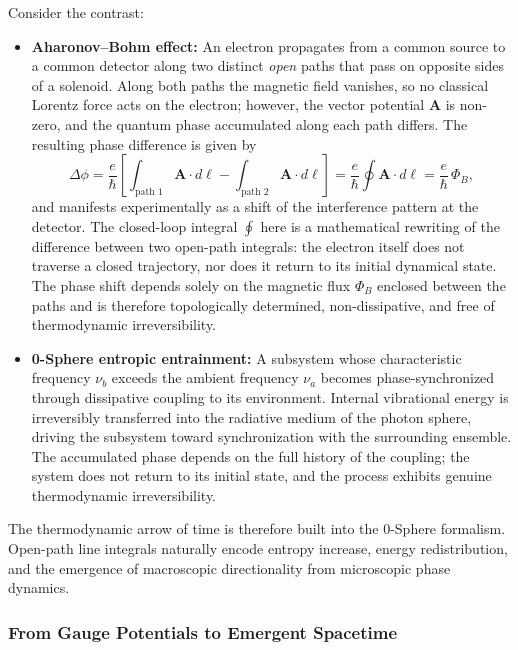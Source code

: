 \documentclass[12pt,letterpaper]{article}
\begin{document}
Consider the contrast:
\begin{itemize}
\item \textbf{Aharonov--Bohm effect:}
An electron propagates from a common source to a common detector along two distinct \emph{open} paths that pass on opposite sides of a solenoid. Along both paths the magnetic field vanishes, so no classical Lorentz force acts on the electron; however, the vector potential $\bm{A}$ is non-zero, and the quantum phase accumulated along each path differs. The resulting phase difference is given by
\[
  \Delta\phi
  = \frac{e}{\hbar}
    \left[
      \int_{\text{path 1}} \bm{A}\cdot d\bm{\ell}
      -
      \int_{\text{path 2}} \bm{A}\cdot d\bm{\ell}
    \right]
  = \frac{e}{\hbar}\oint \bm{A}\cdot d\bm{\ell}
  = \frac{e}{\hbar}\,\Phi_B,
\]
and manifests experimentally as a shift of the interference pattern at the detector. The closed-loop
integral $\oint$ here is a mathematical rewriting of the difference between two open-path integrals: the electron itself does not traverse a closed trajectory, nor does it return to its initial dynamical state. The phase shift depends solely on the magnetic flux $\Phi_B$ enclosed between the paths and is therefore topologically determined, non-dissipative, and free of thermodynamic irreversibility.

\item \textbf{0-Sphere entropic entrainment:}
A subsystem whose characteristic frequency $\nu_b$ exceeds the ambient frequency $\nu_a$ becomes phase-synchronized through dissipative coupling to its environment. Internal vibrational energy is irreversibly transferred into the radiative medium of the photon sphere, driving the subsystem toward synchronization with the surrounding
ensemble. The accumulated phase depends on the full history of the coupling; the system does not return to its initial state, and the process exhibits genuine thermodynamic irreversibility.
\end{itemize}

The thermodynamic arrow of time is therefore built into the 0-Sphere formalism. Open-path line integrals naturally encode entropy increase, energy redistribution, and the emergence of macroscopic directionality from microscopic phase dynamics.

\subsubsection{From Gauge Potentials to Emergent Spacetime}
\label{subsubsec:emergent_spacetime}
\end{document}
